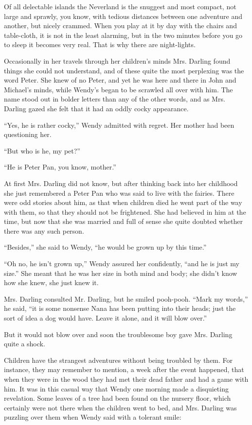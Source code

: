 Of all delectable islands the Neverland is the snuggest and most compact, not large and sprawly, you know, with tedious distances between one adventure and another, but nicely crammed.
When you play at it by day with the chairs and table-cloth, it is not in the least alarming, but in the two minutes before you go to sleep it becomes very real.
That is why there are night-lights.

Occasionally in her travels through her children's minds Mrs. Darling found things she could not understand, and of these quite the most perplexing was the word Peter.
She knew of no Peter, and yet he was here and there in John and Michael's minds, while Wendy's began to be scrawled all over with him.
The name stood out in bolder letters than any of the other words, and as Mrs. Darling gazed she felt that it had an oddly cocky appearance.

``Yes, he is rather cocky,'' Wendy admitted with regret. Her mother had been questioning her.

``But who is he, my pet?''

``He is Peter Pan, you know, mother.''

At first Mrs. Darling did not know, but after thinking back into her childhood she just remembered a Peter Pan who was said to live with the fairies.
There were odd stories about him, as that when children died he went part of the way with them, so that they should not be frightened.
She had believed in him at the time, but now that she was married and full of sense she quite doubted whether there was any such person.

``Besides,'' she said to Wendy, ``he would be grown up by this time.''

``Oh no, he isn't grown up,'' Wendy assured her confidently, ``and he is
just my size.''
She meant that he was her size in both mind and body; she didn't know how she knew, she just knew it.

Mrs. Darling consulted Mr. Darling, but he smiled pooh-pooh.
``Mark my words,'' he said, ``it is some nonsense Nana has been putting into their heads; just the sort of idea a dog would have.
Leave it alone, and it will blow over.''

But it would not blow over and soon the troublesome boy gave Mrs. Darling quite a shock.

Children have the strangest adventures without being troubled by them.
For instance, they may remember to mention, a week after the event happened, that when they were in the wood they had met their dead father and had a game with him.
It was in this casual way that Wendy one morning made a disquieting revelation.
Some leaves of a tree had been found on the nursery floor, which certainly were not there when the children went to bed, and Mrs. Darling was puzzling over them when Wendy said with a tolerant smile:

